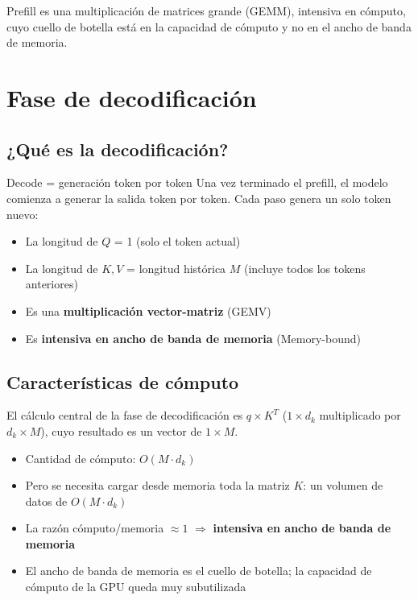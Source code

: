 \documentclass[a4paper]{article}
\begin{document}
Prefill es una multiplicación de matrices grande (GEMM), intensiva en cómputo, cuyo cuello de botella está en la capacidad de cómputo y no en el ancho de banda de memoria.
\section{Fase de decodificación}

\subsection{¿Qué es la decodificación?}

\begin{importantbox}{Decode = generación token por token}
Una vez terminado el prefill, el modelo comienza a generar la salida token por token. Cada paso genera un solo token nuevo:
\begin{itemize}
  \item La longitud de $Q$ = 1 (solo el token actual)
  \item La longitud de $K, V$ = longitud histórica $M$ (incluye todos los tokens anteriores)
  \item Es una \textbf{multiplicación vector-matriz} (GEMV)
  \item Es \textbf{intensiva en ancho de banda de memoria} (Memory-bound)
\end{itemize}
\end{importantbox}

\subsection{Características de cómputo}

El cálculo central de la fase de decodificación es $q \times K^T$ ($1 \times d_k$ multiplicado por $d_k \times M$), cuyo resultado es un vector de $1 \times M$.

\begin{itemize}
  \item Cantidad de cómputo: $O(M \cdot d_k)$
  \item Pero se necesita cargar desde memoria toda la matriz $K$: un volumen de datos de $O(M \cdot d_k)$
  \item La razón cómputo/memoria $\approx 1$ $\Rightarrow$ \textbf{intensiva en ancho de banda de memoria}
  \item El ancho de banda de memoria es el cuello de botella; la capacidad de cómputo de la GPU queda muy subutilizada
\end{itemize}
\end{document}
